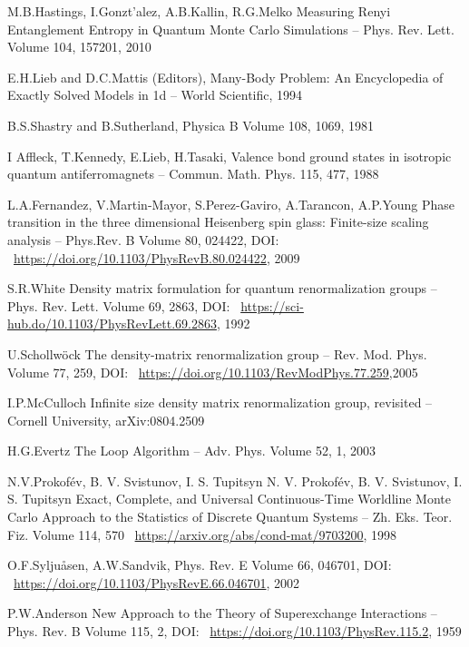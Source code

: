 \documentclass[11pt]{article}
\begin{document}
\begin{thebibliography}{3}
M.B.Hastings, I.Gonzt’alez, A.B.Kallin, R.G.Melko Measuring Renyi Entanglement Entropy in Quantum Monte Carlo Simulations -- Phys. Rev. Lett. Volume 104, 157201, 2010

E.H.Lieb and D.C.Mattis (Editors), Many-Body Problem: An Encyclopedia of Exactly Solved Models in 1d -- World Scientific, 1994

B.S.Shastry and B.Sutherland, Physica B Volume 108, 1069, 1981

I Affleck, T.Kennedy, E.Lieb, H.Tasaki, Valence bond ground states in isotropic quantum antiferromagnets -- Commun. Math. Phys. 115, 477, 1988

L.A.Fernandez, V.Martin-Mayor, S.Perez-Gaviro, A.Tarancon, A.P.Young Phase transition in the three dimensional Heisenberg spin glass: Finite-size scaling analysis -- Phys.Rev. B Volume 80, 024422, DOI: ~\url{https://doi.org/10.1103/PhysRevB.80.024422}, 2009

S.R.White Density matrix formulation for quantum renormalization groups -- Phys. Rev. Lett. Volume 69, 2863, DOI: ~\url{https://sci-hub.do/10.1103/PhysRevLett.69.2863}, 1992

U.Schollwöck The density-matrix renormalization group -- Rev. Mod. Phys. Volume 77, 259, DOI: ~\url{https://doi.org/10.1103/RevModPhys.77.259},2005

I.P.McCulloch Infinite size density matrix renormalization group, revisited -- Cornell University, arXiv:0804.2509

H.G.Evertz The Loop Algorithm -- Adv. Phys. Volume 52, 1, 2003

N.V.Prokofév, B. V. Svistunov, I. S. Tupitsyn N. V. Prokofév, B. V. Svistunov, I. S. Tupitsyn Exact, Complete, and Universal Continuous-Time Worldline Monte Carlo Approach to the Statistics of Discrete Quantum Systems -- Zh. Eks. Teor. Fiz. Volume 114, 570 ~\url{https://arxiv.org/abs/cond-mat/9703200}, 1998

 O.F.Syljuåsen, A.W.Sandvik, Phys. Rev. E Volume 66, 046701, DOI: ~\url{https://doi.org/10.1103/PhysRevE.66.046701}, 2002

P.W.Anderson New Approach to the Theory of Superexchange Interactions -- Phys. Rev. B Volume 115, 2,  DOI: ~\url{https://doi.org/10.1103/PhysRev.115.2}, 1959


\end{thebibliography}
\end{document}
